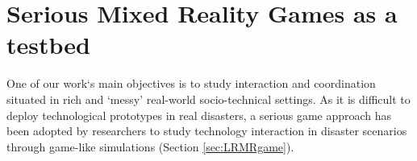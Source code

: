 




\section{Serious Mixed Reality Games as a testbed} \label{sec:SMRG}
One of our work`s main objectives is to study interaction and coordination situated in rich and `messy' real-world socio-technical settings. As it is difficult to deploy technological prototypes in real disasters, a serious game approach has been adopted by researchers to study technology interaction in disaster scenarios through game-like simulations (Section \ref{sec:LRMRgame}).\\

